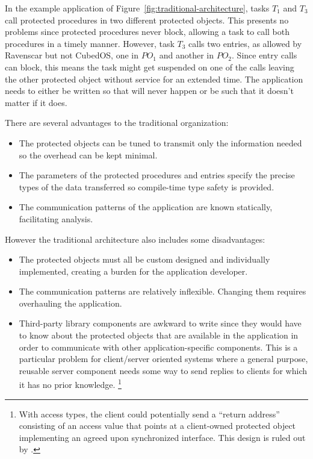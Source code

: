 In the example application of Figure~\ref{fig:traditional-architecture}, tasks $T_1$ and $T_3$
call protected procedures in two different protected objects. This presents no problems since
protected procedures never block, allowing a task to call both procedures in a timely manner.
However, task $T_3$ calls two entries, as allowed by Ravenscar but not CubedOS, one in $PO_1$
and another in $PO_2$. Since entry calls can block, this means the task might get suspended on
one of the calls leaving the other protected object without service for an extended time. The
application needs to either be written so that will never happen or be such that it doesn't
matter if it does.

There are several advantages to the traditional organization:

\begin{itemize}
\item The protected objects can be tuned to transmit only the information needed so the overhead
  can be kept minimal.
\item The parameters of the protected procedures and entries specify the precise types of the
  data transferred so compile-time type safety is provided.
\item The communication patterns of the application are known statically, facilitating analysis.
\end{itemize}

However the traditional architecture also includes some disadvantages:

\begin{itemize}
\item The protected objects must all be custom designed and individually implemented, creating a
  burden for the application developer.
\item The communication patterns are relatively inflexible. Changing them requires overhauling
  the application.
\item Third-party library components are awkward to write since they would have to know about
  the protected objects that are available in the application in order to communicate with other
  application-specific components. This is a particular problem for client/server oriented
  systems where a general purpose, reusable server component needs some way to send replies to
  clients for which it has no prior knowledge. \footnote{With access types, the client could
    potentially send a ``return address'' consisting of an access value that points at a
    client-owned protected object implementing an agreed upon synchronized interface. This design
    is ruled out by \SPARK.}
\end{itemize}

